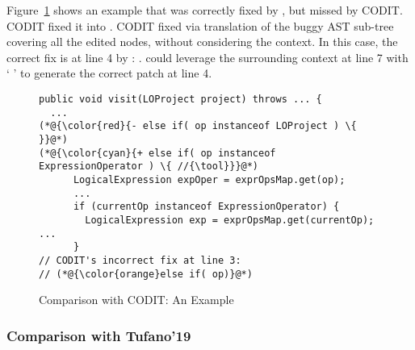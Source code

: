 Figure~\ref{example_codit} shows an example that was correctly fixed
by {\tool}, but missed by CODIT. CODIT fixed it into 
 . CODIT fixed via translation of the buggy AST
sub-tree covering all the edited nodes, without considering the
context.
In this case, the correct fix is at line 4 by {\tool}: 
  
. {\tool} could leverage the surrounding
context at line 7 with ` 
' to generate the correct patch at line 4.



\begin{figure}[t]
	\centering
	\begin{lstlisting}[]
public void visit(LOProject project) throws ... {
  ...
(*@{\color{red}{- else if( op instanceof LOProject ) \{ }}@*)
(*@{\color{cyan}{+ else if( op instanceof ExpressionOperator ) \{ //{\tool}}}@*)
      LogicalExpression expOper = exprOpsMap.get(op);
      ...
      if (currentOp instanceof ExpressionOperator) {
        LogicalExpression exp = exprOpsMap.get(currentOp); ...
      }
// CODIT's incorrect fix at line 3:
// (*@{\color{orange}else if( op)}@*) 
	\end{lstlisting}
        \vspace{-17pt}
	\caption{Comparison with CODIT: An Example}
	\label{example_codit}
\end{figure}

\subsubsection{\bf Comparison with Tufano'19}





